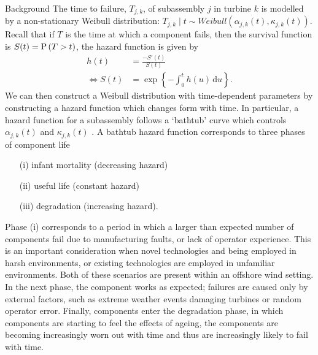 \begin{chapter}{Background \label{Ch:background}}
The time to failure, $T_{j,k}$, of subassembly $j$ in turbine $k$ is modelled by a non-stationary Weibull distribution: $T_{j,k}\mid t \sim Weibull( \alpha_{j,k}(t), \kappa_{j,k}(t) )$. Recall that if $T$ is the time at which a component fails, then the survival function is $S(t) = \mathrm{P}\, (T > t)$, the hazard function is given by
\begin{align}
  h(t) &= \frac{-S'(t)}{S(t)}\\
  \iff  S(t) &=  \exp \left\{ -\int_0^t h(u) \, \textrm{d}  u \right\}.
\end{align}
We can then construct a Weibull distribution with time-dependent parameters by constructing a hazard function which changes form with time. In particular, a hazard function for a subassembly follows a `bathtub' curve which controls $\alpha_{j,k}(t)$ and $\kappa_{j,k}(t)$ . A bathtub hazard function corresponds to three phases of component life
\begin{itemize}
  \item[(i)] infant mortality (decreasing hazard)
  \item[(ii)] useful life (constant hazard)
  \item[(iii)] degradation  (increasing hazard).
\end{itemize}
Phase (i) corresponds to a period in which a larger than expected number of components fail due to manufacturing faults, or lack of operator experience. This is an important consideration when novel technologies and being employed in harsh environments, or existing technologies are employed in unfamiliar environments. Both of these scenarios are present within an offshore wind setting. In the next phase, the component works as expected; failures are caused only by external factors, such as extreme weather events damaging turbines or random operator error. Finally, components enter the degradation phase, in which components are starting to feel the effects of ageing, the components are becoming increasingly worn out with time and thus are increasingly likely to fail with time.


\end{chapter}
